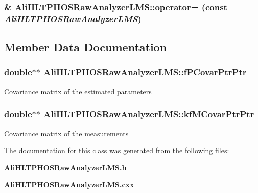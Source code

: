 \subsubsection{\& Ali\-HLTPHOSRaw\-Analyzer\-LMS::operator= (const  {\em Ali\-HLTPHOSRaw\-Analyzer\-LMS})\hspace{0.3cm}{\tt  [inline]}}\label{classAliHLTPHOSRawAnalyzerLMS_a3}




\subsection{Member Data Documentation}
\subsubsection{\setlength{\rightskip}{0pt plus 5cm}double$\ast$$\ast$ {\bf Ali\-HLTPHOSRaw\-Analyzer\-LMS::f\-PCovar\-Ptr\-Ptr}\hspace{0.3cm}{\tt  [private]}}\label{classAliHLTPHOSRawAnalyzerLMS_r1}


Covariance matrix of the estimated parameters 
\subsubsection{\setlength{\rightskip}{0pt plus 5cm}double$\ast$$\ast$ {\bf Ali\-HLTPHOSRaw\-Analyzer\-LMS::kf\-MCovar\-Ptr\-Ptr}\hspace{0.3cm}{\tt  [private]}}\label{classAliHLTPHOSRawAnalyzerLMS_r0}


Covariance matrix of the measurements 

The documentation for this class was generated from the following files:\begin{CompactItemize}
\item 
{\bf Ali\-HLTPHOSRaw\-Analyzer\-LMS.h}\item 
{\bf Ali\-HLTPHOSRaw\-Analyzer\-LMS.cxx}\end{CompactItemize}
